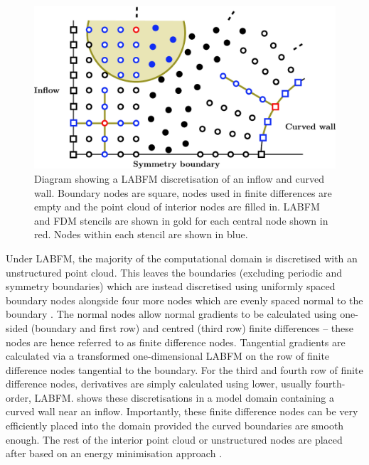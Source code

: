 \begin{figure}[t]
\centering
\includegraphics[scale=0.65]{assets/imgs/LABFM-boundary-stencils.pdf}
\vspace*{0.5em}
\caption{Diagram showing a LABFM discretisation of an inflow and curved wall. Boundary nodes are square, nodes used in finite differences are empty and the point cloud of interior nodes are filled in. LABFM and FDM stencils are shown in gold for each central node shown in red. Nodes within each stencil are shown in blue.}
\label{fig:labfm-boundary}
\end{figure}

Under LABFM, the majority of the computational domain is discretised with an unstructured point cloud. This leaves the boundaries (excluding periodic and symmetry boundaries) which are instead discretised using uniformly spaced boundary nodes alongside four more nodes which are evenly spaced normal to the boundary \cite{king2022HighOrderSimulationsIsothermal}. The normal nodes allow normal gradients to be calculated using one-sided (boundary and first row) and centred (third row) finite differences -- these nodes are hence referred to as finite difference nodes. Tangential gradients are calculated via a transformed one-dimensional LABFM on the row of finite difference nodes tangential to the boundary. For the third and fourth row of finite difference nodes, derivatives are simply calculated using lower, usually fourth-order, LABFM.  shows these discretisations in a model domain containing a curved wall near an inflow. Importantly, these finite difference nodes can be very efficiently placed into the domain provided the curved boundaries are smooth enough. The rest of the interior point cloud or unstructured nodes are placed after based on an energy minimisation approach \cite{king2020HighOrderDifference}.





